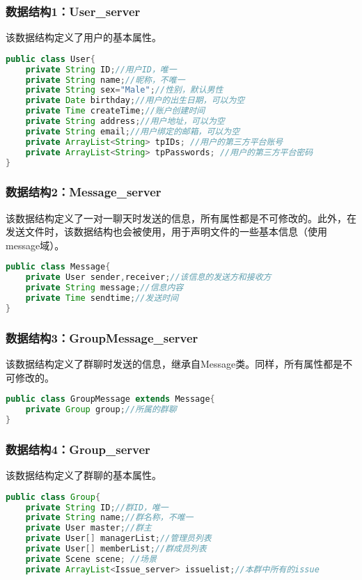 \subsubsection{\color{red} 数据结构1：User\_server}
该数据结构定义了用户的基本属性。
\begin{lstlisting}[language=Java, caption=User定义]
public class User{
    private String ID;//用户ID，唯一
    private String name;//昵称，不唯一
    private String sex="Male";//性别，默认男性
    private Date birthday;//用户的出生日期，可以为空
    private Time createTime;//账户创建时间
    private String address;//用户地址，可以为空
    private String email;//用户绑定的邮箱，可以为空
    private ArrayList<String> tpIDs; //用户的第三方平台账号
    private ArrayList<String> tpPasswords; //用户的第三方平台密码
}
\end{lstlisting}

\subsubsection{数据结构2：Message\_server}
该数据结构定义了一对一聊天时发送的信息，所有属性都是不可修改的。此外，在发送文件时，该数据结构也会被使用，用于声明文件的一些基本信息（使用message域）。
\begin{lstlisting}[language=Java, caption=Message定义]
public class Message{
    private User sender,receiver;//该信息的发送方和接收方
    private String message;//信息内容
    private Time sendtime;//发送时间
}
\end{lstlisting}

\subsubsection{数据结构3：GroupMessage\_server}
该数据结构定义了群聊时发送的信息，继承自Message类。同样，所有属性都是不可修改的。
\begin{lstlisting}[language=Java, caption=GroupMessage定义]
public class GroupMessage extends Message{
    private Group group;//所属的群聊
}
\end{lstlisting}

{\color{red}
\subsubsection{数据结构4：Group\_server}
该数据结构定义了群聊的基本属性。
\begin{lstlisting}[language=Java, caption=Group定义]
public class Group{
    private String ID;//群ID，唯一
    private String name;//群名称，不唯一
    private User master;//群主
    private User[] managerList;//管理员列表
    private User[] memberList;//群成员列表
    private Scene scene; //场景
    private ArrayList<Issue_server> issuelist;//本群中所有的issue
    
\end{lstlisting}
}


